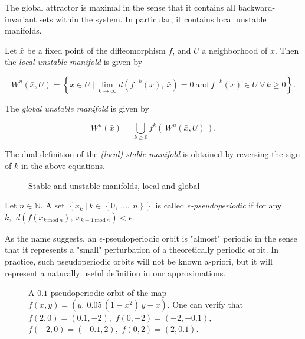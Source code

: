 The global attractor is maximal in the sense that it contains all backward-invariant 
sets within the system. In particular, it contains local unstable manifolds.

\begin{definition}
    \cite*{dynbook} Let $\bar{x}$ be a fixed point of the diffeomorphism $f$, and $U$ a neighborhood of $x$. 
    Then the \emph{local unstable manifold} is given by

    \begin{equation}
        W^u(\bar{x}, U) = \left\{x \in U\ \vert\ \lim\limits_{k \to \infty} 
        d(f^{-k}(x),\ \bar{x}) = 0\ \text{and}\ f^{-k}(x) \in U\ \forall\, k \geq 0\right\}.
    \end{equation}

    The \emph{global unstable manifold} is given by

    \begin{equation}
        W^u(\bar{x}) = \bigcup\limits_{k \geq 0} f^k(\,W^u(\bar{x}, U)\,).
    \end{equation}

    The dual definition of the \emph{(local) stable manifold} is obtained by reversing the 
    sign of $k$ in the above equations.
\end{definition}

\begin{figure}[ht]
    \caption{\cite*{dynskript} Stable and unstable manifolds, local and global}
    \label{fig:manifold}    
\end{figure}

\begin{definition}[Pseudoperiodic]
    \cite*{dynbook} Let $n\in \mathbb{N}$. A set 
    $\left\{ x_k\ \vert\ k \in \left\{ 0,\ \dotsc ,\ n \right\} \right\}$ 
    is called \emph{$\epsilon$-pseudoperiodic} if for any
    $k,\,\ d(f(x_{k\, \text{mod}\, n}),\ x_{k + 1\, \text{mod}\, n}) < \epsilon$.
\end{definition}

As the name suggests, an $\epsilon$-pseudoperiodic orbit is "almost" periodic in the sense 
that it represents a "small" perturbation of a theoretically periodic orbit. In practice,
such pseudoperiodic orbits will not be known a-priori, but it will represent a naturally 
useful definition in our approximations.

\begin{figure}[ht]
    \caption{
        \cite*{dynbook} A $0.1$-pseudoperiodic orbit of the map $f(x,y) = (y,\ 0.05\, (1 - x^2)\, y - x)$. 
        One can verify that $f(2, 0) = (0.1, -2),$ $f(0, -2) = (-2, -0.1),$ 
        $f(-2, 0) = (-0.1, 2),$ $f(0, 2) = (2, 0.1).$
    }
    \label{fig:pseudoperiodic}
\end{figure}

